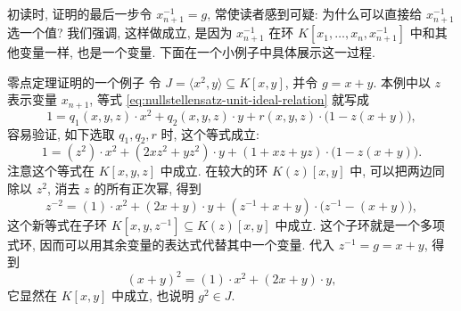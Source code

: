 初读时, 证明的最后一步令 $x_{n+1}^{-1}=g$, 常使读者感到可疑: 为什么可以直接给 $x_{n+1}^{-1}$ 选一个值? 我们强调, 这样做成立, 是因为 $x_{n+1}^{-1}$ 在环 $K[x_{1},\ldots,x_{n},x_{n+1}^{-1}]$ 中和其他变量一样, 也是一个变量. 下面在一个小例子中具体展示这一过程.

\begin{Example}{零点定理证明的一个例子}\leavevmode\label{ex:nullstellensatz-proof-illustration}
令 $J=\langle x^{2},y\rangle\subseteq K[x,y]$, 并令 $g=x+y$. 本例中以 $z$ 表示变量 $x_{n+1}$, 等式 \eqref{eq:nullstellensatz-unit-ideal-relation} 就写成
\[
  1=q_{1}(x,y,z)\cdot x^{2}+q_{2}(x,y,z)\cdot y
    +r(x,y,z)\cdot\bigl(1-z(x+y)\bigr),
\]
容易验证, 如下选取 $q_{1},q_{2},r$ 时, 这个等式成立:
\[
  1=(z^{2})\cdot x^{2}+(2xz^{2}+yz^{2})\cdot y
    +(1+xz+yz)\cdot\bigl(1-z(x+y)\bigr).
\]
注意这个等式在 $K[x,y,z]$ 中成立. 在较大的环 $K(z)[x,y]$ 中, 可以把两边同除以 $z^{2}$, 消去 $z$ 的所有正次幂, 得到
\[
  z^{-2}=(1)\cdot x^{2}+(2x+y)\cdot y
    +(z^{-1}+x+y)\cdot\bigl(z^{-1}-(x+y)\bigr),
\]
这个新等式在子环 $K[x,y,z^{-1}]\subseteq K(z)[x,y]$ 中成立. 这个子环就是一个多项式环, 因而可以用其余变量的表达式代替其中一个变量. 代入 $z^{-1}=g=x+y$, 得到
\[
  (x+y)^{2}=(1)\cdot x^{2}+(2x+y)\cdot y,
\]
它显然在 $K[x,y]$ 中成立, 也说明 $g^{2}\in J$.
\end{Example}

